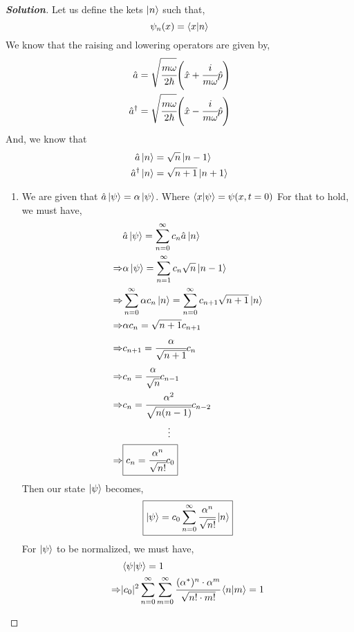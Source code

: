 \documentclass[10pt]{scrartcl}
\theoremstyle{definition}
\newenvironment{solution} {\begin{proof}[\normalfont \textbf{Solution}]} {\end{proof}}
\newcommand*{\Op}{\hat{p}}
\newcommand*{\Ox}{\hat{x}}
\newcommand*{\Oa}{\hat{a}}
\begin{document}
\begin{solution}
    Let us define the kets $\ket{n}$ such that, $$\psi_n(x) = \ip{x}{n}$$ We know that the raising
    and lowering operators are given by,
    \begin{align*}
        \Oa &= \sqrt{\cfrac{m\omega}{2\hbar}}\qty(\Ox + \cfrac{i}{m\omega}\Op) \\
        \Oa^\dagger &= \sqrt{\cfrac{m\omega}{2\hbar}}\qty(\Ox - \cfrac{i}{m\omega}\Op)
    \end{align*}
    And, we know that 
    \begin{align*}
        \Oa \ket{n} &= \sqrt{n}\ket{n - 1} \\
        \Oa^\dagger \ket{n} &= \sqrt{n + 1}\ket{n + 1}
    \end{align*}
    \begin{enumerate}[label=(\alph*)]
        \item We are given that $\Oa \ket{\psi} = \alpha \ket{\psi}$. Where $\ip{x}{\psi} = \psi(x, t = 0)$ For that to hold, we must have, 
            \begin{align*}
                &\Oa\ket{\psi} = \sum_{n = 0}^{\infty} c_n \Oa \ket{n} \\
                \Rightarrow &\alpha \ket{\psi} = \sum_{n = 1}^{\infty} c_n \sqrt{n} \ket{n - 1} \\
                \Rightarrow &\sum_{n = 0}^{\infty} \alpha c_n \ket{n} = \sum_{n = 0}^{\infty} c_{n + 1} \sqrt{n + 1} \ket{n} \\ 
                \Rightarrow &\alpha c_n = \sqrt{n + 1} c_{n + 1} \\
                \Rightarrow &c_{n + 1} = \cfrac{\alpha}{\sqrt{n + 1}} c_{n}\\
                \Rightarrow &c_{n} = \cfrac{\alpha}{\sqrt{n}}c_{n - 1} \\
                \Rightarrow &c_{n} = \cfrac{\alpha^2}{\sqrt{n(n-1)}} c_{n - 2}\\
                            &\quad \quad \quad \quad ~~ \vdots \\
                \Rightarrow &\boxed{c_n = \cfrac{\alpha^n}{\sqrt{n!}}c_0}
            \end{align*}
            Then our state $\ket{\psi}$ becomes, $$\boxed{\ket{\psi} = c_0 \sum_{n = 0}^{\infty} \cfrac{\alpha^n}{\sqrt{n!}} \ket{n}}$$
            For $\ket\psi$ to be normalized, we must have,
            \begin{align*}
                &\ip{\psi}{\psi} = 1 \\ 
                \Rightarrow &|c_0|^2 \sum_{n = 0}^{\infty} \sum_{m = 0}^{\infty} \cfrac{(\alpha^*)^n \cdot \alpha^m}{\sqrt{n! \cdot m!}} \ip{n}{m}  = 1\\

\end{align*}
\end{enumerate}
\end{solution}
\end{document}
